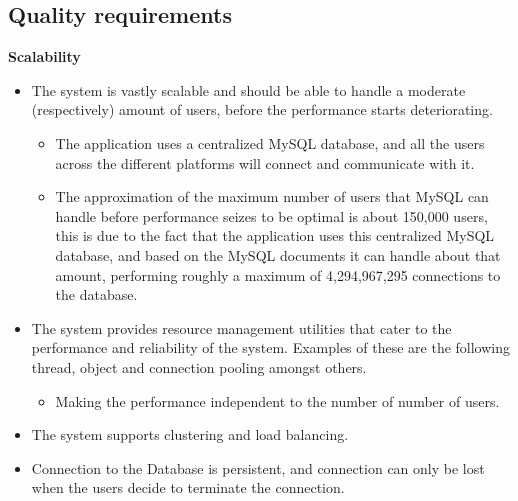 \documentclass[10pt,a4paper]{article}
\begin{document}
	
	
\subsection{Quality requirements}
\begin{center}\textbf{Scalability}\end{center}
                               \begin{itemize}
                                                \item The system is vastly scalable and should be able to handle a moderate (respectively) amount of users, before the performance starts deteriorating.
                                                \begin{itemize}
                                                                \item The application uses a centralized MySQL database, and all the users across the different platforms will connect and communicate with it. 
                                                                \item The approximation of the maximum number of users that MySQL can handle before performance seizes to be optimal is about 150,000 users, this is due to the fact that the application uses this centralized MySQL database, and based on the MySQL documents it can handle about that amount, performing roughly a maximum of 4,294,967,295 connections to the database. 
                                                \end{itemize}
                                \end{itemize}
                \begin{itemize}
                        \item The system provides resource management utilities that cater to the performance and reliability of the system. Examples of these are the following thread, object and connection pooling amongst others.
                        \begin{itemize}
                                \item Making the performance independent to the number of number of users.
                        \end{itemize}
                \end{itemize}
                \begin{itemize}
                        \item The system supports clustering and load balancing.
                \end{itemize}
                \begin{itemize}
                        \item Connection to the Database is persistent, and connection can only be lost when the users decide to terminate the connection.\\
                \end{itemize}
\end{document}
